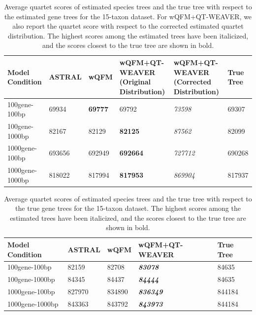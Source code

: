 \documentclass[10pt,a4paper]{article}
\begin{document}
\begin{appendices}
\begin{table}[h!]
    \centering
    \caption{Average quartet scores of estimated species trees and the true tree with respect to the estimated gene trees for the 15-taxon dataset. For wQFM+QT-WEAVER, we also report the quartet score with respect to the corrected estimated quartet distribution. The highest scores among the estimated trees have been italicized, and the scores closest to the true tree are shown in bold.}
    \label{tab:15-quartet-scores-estimated}
    \begin{tabular}{|C{2cm}|C{2.5cm}|C{2.5cm}|C{2.5cm}|C{2.5cm}|C{2.5cm}|}
        \hline
        \textbf{Model Condition} & \textbf{ASTRAL} & \textbf{wQFM} & \textbf{wQFM+QT-WEAVER (Original Distribution)} & \textbf{wQFM+QT-WEAVER (Corrected Distribution)} & \textbf{True Tree} \\
        \hline \hline
        100gene-100bp & 69934 & \textbf{69777} & 69792 & \textit{73598} & 69307 \\
        \hline
        100gene-1000bp & 82167 & 82129 & \textbf{82125} & \textit{87562} & 82099 \\
        \hline
        1000gene-100bp & 693656 & 692949 & \textbf{692664} & \textit{727712} & 690268 \\
        \hline
        1000gene-1000bp & 818022 & 817994 & \textbf{817953} & \textit{869904} & 817937 \\
        \hline
    \end{tabular}
\end{table}

\begin{table}[h!]
    \centering
    \caption{Average quartet scores of estimated species trees and the true tree with respect to the true gene trees for the 15-taxon dataset. The highest scores among the estimated trees have been italicized, and the scores closest to the true tree are shown in bold.}
    \label{tab:15-quartet-scores-true}
    \begin{tabular}{|C{2.3cm}|C{3cm}|C{3cm}|C{3cm}|C{3cm}|}
        \hline
        \textbf{Model Condition} & \textbf{ASTRAL} & \textbf{wQFM} & \textbf{wQFM+QT-WEAVER} & \textbf{True  Tree} \\
        \hline \hline
        100gene-100bp & 82159 & 82708 & \textbf{\textit{83078}} & 84635 \\
        \hline
        100gene-1000bp & 84345 & 84437 & \textbf{\textit{84444}} & 84635 \\
        \hline
        1000gene-100bp & 827970 & 834890 & \textbf{\textit{836349}} & 844184 \\
        \hline
        1000gene-1000bp & 843363 & 843792 & \textbf{\textit{843973}} & 844184 \\
        \hline
    \end{tabular}
\end{table}


\end{appendices}
\end{document}
